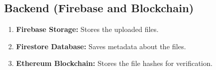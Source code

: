 \documentclass[12pt,a4paper]{report}
\begin{document}
   
   
   
   
   

\subsection{Backend (Firebase and Blockchain)}
\begin{enumerate}
   \item \textbf{Firebase Storage:} Stores the uploaded files.
   \item \textbf{Firestore Database:} Saves metadata about the files.
   \item \textbf{Ethereum Blockchain:} Stores the file hashes for verification.
\end{enumerate}
\end{document}
